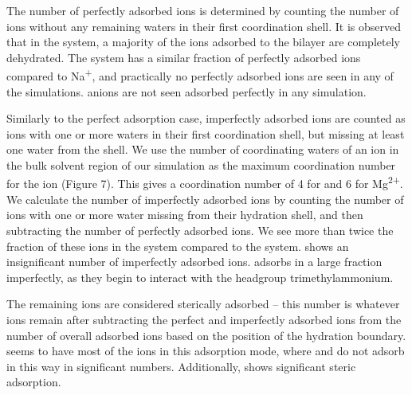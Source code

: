 The number of perfectly adsorbed ions is determined by counting the number of ions without any remaining 
waters in their first coordination shell. It is observed that in the \na system, a 
majority of the ions adsorbed to the bilayer are completely dehydrated. %
The \li system has a similar fraction of perfectly adsorbed ions compared to Na\textsuperscript{+}, 
and practically no perfectly adsorbed 
ions are seen in any of the \mg simulations. \cl anions are not seen adsorbed perfectly in any simulation.

Similarly to the perfect adsorption case, imperfectly adsorbed ions are counted as ions with one or more waters in their 
first coordination shell, but missing at least one
water from the shell. {We use the number of coordinating waters of an ion in the bulk solvent region
    of our simulation as the maximum coordination number for the ion (Figure 7). This
gives a coordination number of 4 for \li and 6 for 
Mg\textsuperscript{2+}.} We calculate 
{the number of imperfectly adsorbed ions} by counting the number of ions with 
one or more water missing from their hydration shell, and then subtracting the number of perfectly adsorbed ions.
We see more than twice the fraction of these ions in the \li system compared to the \na system. \mg shows an insignificant
number of imperfectly adsorbed ions. \cl adsorbs in a large fraction imperfectly, as they begin to interact with the headgroup trimethylammonium.

The remaining ions are considered sterically adsorbed -- this number is whatever ions remain after subtracting the 
perfect and imperfectly adsorbed ions from the number of overall adsorbed ions based on the position of the hydration boundary. 
\mg seems to have most of the ions in this adsorption mode, where \na and \li do not 
adsorb in this way in significant numbers. Additionally, \cl shows significant steric adsorption.

